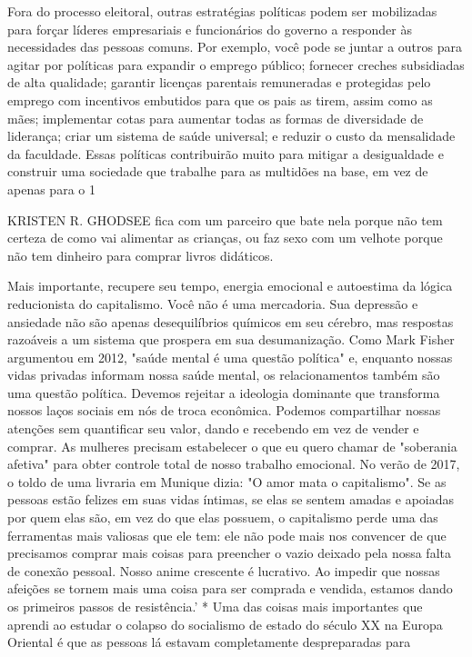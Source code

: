  \par 
Fora do processo eleitoral, outras estratégias políticas podem ser mobilizadas para forçar líderes empresariais e funcionários do governo a responder às necessidades das pessoas comuns. Por exemplo, você pode se juntar a outros para agitar por políticas para expandir o emprego público; fornecer creches subsidiadas de alta qualidade; garantir licenças parentais remuneradas e protegidas pelo emprego com incentivos embutidos para que os pais as tirem, assim como as mães; implementar cotas para aumentar todas as formas de diversidade de liderança; criar um sistema de saúde universal; e reduzir o custo da mensalidade da faculdade. Essas políticas contribuirão muito para mitigar a desigualdade e construir uma sociedade que trabalhe para as multidões na base, em vez de apenas para o 1%
 \par 
KRISTEN R. GHODSEE fica com um parceiro que bate nela porque não tem certeza de como vai alimentar as crianças, ou faz sexo com um velhote porque não tem dinheiro para comprar livros didáticos.
 \par 
Mais importante, recupere seu tempo, energia emocional e autoestima da lógica reducionista do capitalismo. Você não é uma mercadoria. Sua depressão e ansiedade não são apenas desequilíbrios químicos em seu cérebro, mas respostas razoáveis ​​a um sistema que prospera em sua desumanização. Como Mark Fisher argumentou em 2012, "saúde mental é uma questão política" e, enquanto nossas vidas privadas informam nossa saúde mental, os relacionamentos também são uma questão política. Devemos rejeitar a ideologia dominante que transforma nossos laços sociais em nós de troca econômica. Podemos compartilhar nossas atenções sem quantificar seu valor, dando e recebendo em vez de vender e comprar. As mulheres precisam estabelecer o que eu quero chamar de "soberania afetiva" para obter controle total de nosso trabalho emocional. No verão de 2017, o toldo de uma livraria em Munique dizia: "O amor mata o capitalismo". Se as pessoas estão felizes em suas vidas íntimas, se elas se sentem amadas e apoiadas por quem elas são, em vez do que elas possuem, o capitalismo perde uma das ferramentas mais valiosas que ele tem: ele não pode mais nos convencer de que precisamos comprar mais coisas para preencher o vazio deixado pela nossa falta de conexão pessoal. Nosso anime crescente é lucrativo. Ao impedir que nossas afeições se tornem mais uma coisa para ser comprada e vendida, estamos dando os primeiros passos de resistência.’ * Uma das coisas mais importantes que aprendi ao estudar o colapso do socialismo de estado do século XX na Europa Oriental é que as pessoas lá estavam completamente despreparadas para
